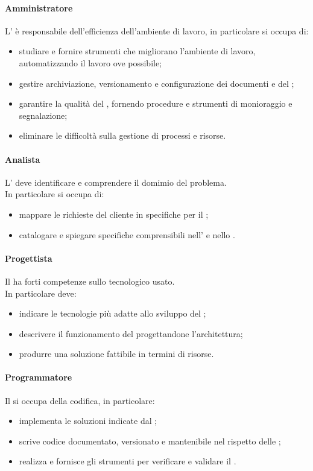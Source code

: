  \paragraph{Amministratore}
 L'\AMM{} è responsabile dell'efficienza dell'ambiente di lavoro, in particolare si occupa di:
 \begin{itemize}
  \item studiare e fornire strumenti che migliorano l'ambiente di lavoro, automatizzando il lavoro ove possibile;
  \item gestire archiviazione, versionamento e configurazione dei documenti e del ;
  \item garantire la qualità del , fornendo procedure e strumenti di monioraggio e segnalazione;
  \item eliminare le difficoltà sulla gestione di processi e risorse.
 \end{itemize}
 \paragraph{Analista}
 L'\AN{} deve identificare e comprendere il domimio del problema. \\
 In particolare si occupa di:
 \begin{itemize}
  \item mappare le richieste del cliente in specifiche per il ;
  \item catalogare e spiegare specifiche comprensibili nell'\ARdoc{} e nello \SFdoc{}.
 \end{itemize}
 \paragraph{Progettista}
 Il \PJ{} ha forti competenze sullo  tecnologico usato. \\
 In particolare deve: 
 \begin{itemize}
  \item indicare le tecnologie più adatte allo sviluppo del ;
  \item descrivere il funzionamento del  progettandone l'architettura;
  \item produrre una soluzione fattibile in termini di risorse.
 \end{itemize}
 \paragraph{Programmatore}
 Il \PR{} si occupa della codifica, in particolare:
 \begin{itemize}
  \item implementa le soluzioni indicate dal \PJ ;
  \item scrive codice documentato, versionato e mantenibile nel rispetto delle \NPdoc ;
  \item realizza e fornisce gli strumenti per verificare e validare il .
 \end{itemize}
